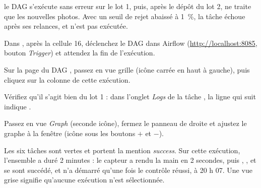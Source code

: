 \begin{resultat}
le DAG s'exécute sans erreur sur le lot 1, puis, après le dépôt du lot 2, ne traite que les
nouvelles photos. Avec un seuil de rejet abaissé à 1~\%, la tâche  échoue
après ses relances, et  n'est pas exécutée.
\end{resultat}

\begin{obtenir}
  \item Dans , après la cellule 16, déclenchez le DAG dans Airflow (\url{http://localhost:8085}, bouton \emph{Trigger}) et attendez la fin de l'exécution.
  \item Sur la page du DAG , passez en vue grille (icône carrée en haut à gauche), puis cliquez sur la colonne de cette exécution.
  \item Vérifiez qu'il s'agit bien du lot 1 : dans l'onglet \emph{Logs} de la tâche , la ligne qui suit  indique .
  \item Passez en vue \emph{Graph} (seconde icône), fermez le panneau de droite et ajustez le graphe à la fenêtre (icône sous les boutons $+$ et $-$).
\end{obtenir}
\begin{lecture}
Les six tâches sont vertes et portent la mention \emph{success}. Sur cette exécution, l'ensemble a
duré 2 minutes : le capteur  a rendu la main en 2 secondes, puis
, ,  et  se sont
succédé, et  n'a démarré qu'une fois le contrôle réussi, à 20 h 07. Une vue grise
signifie qu'aucune exécution n'est sélectionnée.
\end{lecture}

